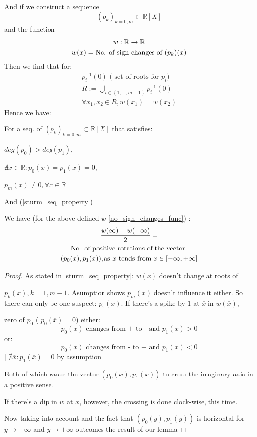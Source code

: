 And if we construct a sequence
\[
(p_k)_{k = \overline{0,m}} \subset \mathbb{R}[X]
\]
and the function
\begin{gather}\label{no_sign_changes_func}
w : \mathbb{R} \rightarrow \mathbb{R} \notag  \\
w(x) = \text{No. of sign changes of  } (p_k)(x) \notag
\end{gather}
Then we find that for:
\begin{gather*}
p_i^{-1}(0) \text{ ( set of roots for $p_i$) } \\
R := \bigcup_{i \in \left\{ 1, \dots, m-1 \right\} } p_i^{-1}(0) \\
\forall x_1, x_2 \in R, w(x_1) = w(x_2)
\end{gather*}
Hence we have:
\begin{lemma}\label{sturm_lemma}
For a seq. of $  (p_k)_{k = \overline{0,m}} \subset \mathbb{R}[X]$
that satisfies:

$ deg(p_0) > deg(p_1), $

$\nexists x \in \mathbb{R} : p_0(x) = p_1(x) = 0, $

$p_m(x) \neq 0, \forall x \in \mathbb{R}$

And (\ref{sturm_seq_property})
\par
We have (for the above defined $w$ \ref{no_sign_changes_func}) :
\begin{gather}
	\frac{w(\infty) - w(-\infty)}{2} =  \notag \\
	\text{No. of positive rotations of the vector } \notag \\
	(p_0(x), p_1(x)), \text{as $x$ tends from  } x \in [-\infty, +\infty] \notag
\end{gather}
\end{lemma}

\begin{proof}

As stated in \ref{sturm_seq_property}: $w(x)$ doesn't change at roots of

$p_k(x), k = \overline{1,m-1}$. Asumption  shows $p_m(x)$
doesn't influence it either. So there can only be one suspect:
$p_0(x)$. If there's a spike by $1$ at $\overline{x}$ in $w(\overline{x})$,

zero of $p_0$
(   $p_0(\overline{x}) =0 $) either:
\[
	p_0(x) \text{ changes from + to - and   } p_1(\overline{x}) > 0
\]
or:
\[
	p_0(x) \text{ changes from - to + and  } p_1(\overline{x}) < 0
\]
[   $\nexists \overline{x}: p_1(\overline{x}) = 0$ by assumption   ]

Both of which cause the vector $(p_0(x), p_1(x))$ to cross the
imaginary axis in a positive sense.

If there's a dip in $w$ at $\overline{x}$, however, the crossing is
done clock-wise, this time.

Now taking  into account and the fact that $(p_0(y), p_1(y))$
is horizontal for $y \rightarrow  - \infty$ and $y \rightarrow +
\infty  $ outcomes the result of our lemma
\end{proof}

